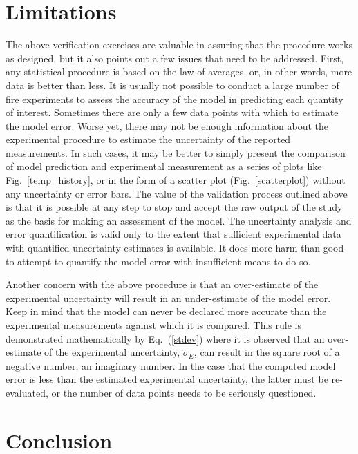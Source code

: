 \section{Limitations}

The above verification exercises are valuable in assuring that the procedure works as designed, but it also points out a few issues that need to be addressed. First, any
statistical procedure is based on the law of averages, or, in other words, more data is better than less. It is usually not possible to conduct a large number of
fire experiments
to assess the accuracy of the model in predicting each quantity of interest. Sometimes there are only a few data points with which to estimate the model error. Worse yet,
there may not be enough information about the experimental procedure to estimate the uncertainty of the reported measurements. In such cases, it may be better
to simply present the comparison of model prediction and experimental measurement as a series of plots like Fig.~\ref{temp_history}, or in the form of a scatter plot
(Fig.~\ref{scatterplot}) without any uncertainty or error bars. The value of the validation process outlined above is that it is
possible at any step to stop and accept the raw output of the study as the basis for making an assessment of the model.
The uncertainty analysis and error quantification is valid only to
the extent that sufficient experimental data with quantified uncertainty estimates is available.
It does more harm than good to attempt to quantify the model error
with insufficient means to do so.

Another concern with the above procedure is that an over-estimate of the experimental uncertainty will result in an under-estimate of the model error. Keep
in mind that the model can never be declared more accurate than the experimental measurements against which it is compared. This rule is demonstrated
mathematically by Eq.~(\ref{stdev}) where it is observed that an over-estimate of the experimental uncertainty, $\widetilde{\sigma}_E$, can result in
the square root of a negative number, an imaginary number. In the case that the computed model error is less than the estimated experimental uncertainty, the
latter must be re-evaluated, or the number of data points needs to be seriously questioned.



\section{Conclusion}

